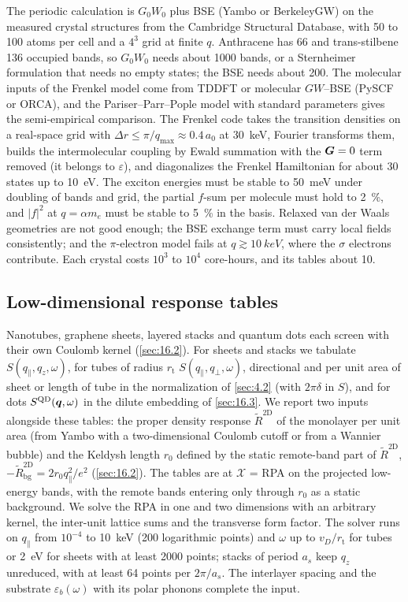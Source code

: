 The periodic calculation is $G_0W_0$ plus BSE (Yambo or BerkeleyGW) on the measured crystal structures from the Cambridge Structural Database, with 50 to 100 atoms per cell and a $4^3$ grid at finite $q$. Anthracene has 66 and trans-stilbene 136 occupied bands, so $G_0W_0$ needs about 1000 bands, or a Sternheimer formulation that needs no empty states; the BSE needs about 200. The molecular inputs of the Frenkel model come from TDDFT or molecular $GW$--BSE (PySCF or ORCA), and the Pariser--Parr--Pople model with standard parameters gives the semi-empirical comparison. The Frenkel code takes the transition densities on a real-space grid with $\Delta r \le \pi/q_{\mathrm{max}} \approx 0.4\,a_0$ at \SI{30}{keV}, Fourier transforms them, builds the intermolecular coupling by Ewald summation with the $\bm{G} = 0$ term removed (it belongs to $\varepsilon$), and diagonalizes the Frenkel Hamiltonian for about 30 states up to \SI{10}{eV}. The exciton energies must be stable to \SI{50}{meV} under doubling of bands and grid, the partial $f$-sum per molecule must hold to \SI{2}{\percent}, and $|f|^2$ at $q = \alpha m_e$ must be stable to \SI{5}{\percent} in the basis. Relaxed van der Waals geometries are not good enough; the BSE exchange term must carry local fields consistently; and the $\pi$-electron model fails at $q \gtrsim \SI{10}{keV}$, where the $\sigma$ electrons contribute. Each crystal costs $10^3$ to $10^4$ core-hours, and its tables about 10.

\subsection{Low-dimensional response tables}

Nanotubes, graphene sheets, layered stacks and quantum dots each screen with their own Coulomb kernel (\cref{sec:16.2}). For sheets and stacks we tabulate $S(q_\parallel,q_z,\omega)$, for tubes of radius $r_{\mathrm{t}}$ $S(q_\parallel,q_\perp,\omega)$, directional and per unit area of sheet or length of tube in the normalization of \cref{sec:4.2} (with $2\pi\delta$ in $S$), and for dots $S^{\mathrm{QD}}(\bm{q},\omega)$ in the dilute embedding of \cref{sec:16.3}. We report two inputs alongside these tables: the proper density response $\tilde R^{\mathrm{2D}}$ of the monolayer per unit area (from Yambo with a two-dimensional Coulomb cutoff or from a Wannier bubble) and the Keldysh length $r_0$ defined by the static remote-band part of $\tilde R^{\mathrm{2D}}$, $-\tilde R^{\mathrm{2D}}_{\mathrm{bg}} = 2r_0q_\parallel^2/e^2$ (\cref{sec:16.2}). The tables are at $\mathcal{X}$ = RPA on the projected low-energy bands, with the remote bands entering only through $r_0$ as a static background. We solve the RPA in one and two dimensions with an arbitrary kernel, the inter-unit lattice sums and the transverse form factor. The solver runs on $q_\parallel$ from $10^{-4}$ to \SI{10}{keV} (200 logarithmic points) and $\omega$ up to $v_D/r_{\mathrm{t}}$ for tubes or \SI{2}{eV} for sheets with at least 2000 points; stacks of period $a_s$ keep $q_z$ unreduced, with at least 64 points per $2\pi/a_s$. The interlayer spacing and the substrate $\varepsilon_b(\omega)$ with its polar phonons complete the input.

